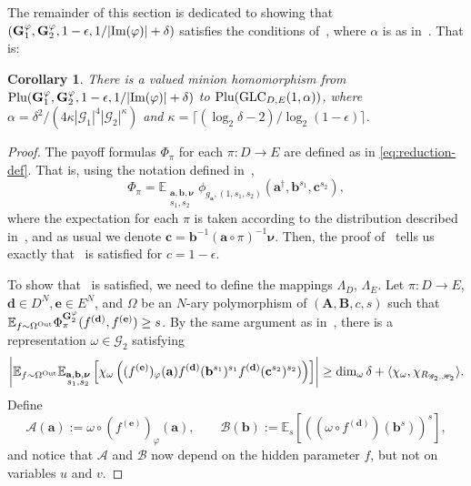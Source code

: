 \documentclass[a4paper,11pt]{article}
\newtheorem{corollary}[theorem]{Corollary}
\theoremstyle{definition}
\newcommand{\tuple}[1]{{\mathbf{#1}}}
\newcommand{\ex}[1]{\mathbb{E}_{#1}}
\newcommand{\gr}{\mathscr{G}}
\newcommand{\sgr}{\mathscr{H}}
\newcommand{\bfa}{\mathbf{A}}
\newcommand{\bfb}{\mathbf{B}}
\newcommand{\ba}{\mathbf{a}}
\newcommand{\bb}{\mathbf{b}}
\newcommand{\bc}{\mathbf{c}}
\newcommand{\bd}{\mathbf{d}}
\newcommand{\be}{\mathbf{e}}
\newcommand{\glc}{\mathrm{GLC}}
\newcommand{\abcs}{(\bfa,\bfb,c,s)}
\newcommand{\im}{\textnormal{Im}}
\newcommand{\A}{\mathcal{A}}
\newcommand{\B}{\mathcal{B}}
\newcommand{\plu}{\textnormal{Plu}}
\begin{document}
The remainder of this section is dedicated to showing that $(\mathbf{G}^\varphi_1,\mathbf{G}^\varphi_2,1-\epsilon,1/|\im(\varphi)|+\delta)$ 
satisfies the conditions of~, where $\alpha$ is as in~. That is:

\begin{corollary}
    There is a valued minion homomorphism from $\plu(\mathbf{G}^\varphi_1,\mathbf{G}^\varphi_2,1-\epsilon,1/|\im(\varphi)|+\delta)$ to $\plu(\glc_{D,E}(1,\alpha))$, where $\alpha=\delta^2/(4\kappa |\gr_1|^4 |\gr_2|^\kappa)$ and $\kappa= \lceil(\log_2 \delta - 2)/\log_2(1-\epsilon)\rceil$.
\end{corollary}

\begin{proof}
The payoff formulas $\Phi_{\pi}$ for each $\pi:D\to E$ are defined as in \eqref{eq:reduction-def}. That is, using the notation defined in~,
\begin{equation*}
\Phi_\pi =  \ex{\substack{\tuple{a},\tuple{b}, \bm{\nu}\\ s_1,s_2}} \phi_{g_{\tuple{a}},(1,s_1,s_2)}(\tuple{a}^\dagger,\tuple{b}^{s_1},\tuple{c}^{s_2}),
\end{equation*}
where the expectation for each $\pi$ is taken according to the distribution described in~, and as usual we denote $\tuple{c} =
\tuple{b}^{-1} (\tuple{a} \circ \pi)^{-1}\bm{\nu}$. Then, the proof of~ tells us exactly that~ is satisfied for $c=1-\epsilon$.

To show that~ is satisfied, we need to define the mappings $\Lambda_D$, $\Lambda_E$. Let $\pi:D\to E$, $\mathbf{d}\in D^N,\mathbf{e}\in E^N$, and $\Omega$ be an $N$-ary polymorphism of $\abcs$ such that $\ex{f\sim \Omega^{\textnormal{Out}}}  \Phi^{\mathbf{G}^\varphi_2}_{\pi}(f^{(\mathbf{d})},f^{(\mathbf{e})}) \geq s$. By the same argument as in~, there is a representation $\omega \in\widehat{\gr_2}$ satisfying
 \begin{equation*}
\left| \ex{f\sim \Omega^{\textnormal{Out}}} \ex{\substack{\tuple{a},\tuple{b},\bm{\nu}\\ s_1,s_2}}\left[ \chi_{\omega}\left((f^{(\mathbf{e})})_{\varphi}(\ba)f^{(\mathbf{d})}(\bb^{s_1})^{s_1}f^{(\mathbf{d})}(\bc^{s_2})^{s_2}) \right) \right] \right| \geq  \dim_\omega\delta 
+ \langle \chi_\omega, \chi_{R_{\gr_2,\sgr_2}} \rangle.
\end{equation*}
Define \begin{equation} 
    \A(\ba):= \omega \circ (f^{(\be)})_\varphi(\ba), \quad \quad \B(\bb):= \ex{s} [ ((\omega \circ f^{(\bd)})(\bb^s))^s],
\end{equation}
and notice that $\A$ and $\B$ now depend on the hidden parameter $f$, but not on variables $u$ and $v$.


\end{proof}
\end{document}
